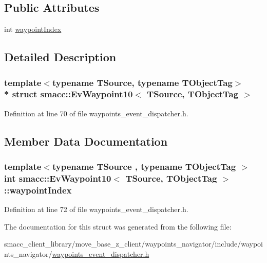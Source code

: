 \subsection*{Public Attributes}
\begin{DoxyCompactItemize}
\item 
int \hyperlink{structsmacc_1_1EvWaypoint10_a142f5446f2f9181a72b36b1d21d9adba}{waypoint\+Index}
\end{DoxyCompactItemize}


\subsection{Detailed Description}
\subsubsection*{template$<$typename T\+Source, typename T\+Object\+Tag$>$\\*
struct smacc\+::\+Ev\+Waypoint10$<$ T\+Source, T\+Object\+Tag $>$}



Definition at line 70 of file waypoints\+\_\+event\+\_\+dispatcher.\+h.



\subsection{Member Data Documentation}
\subsubsection[{\texorpdfstring{waypoint\+Index}{waypointIndex}}]{\setlength{\rightskip}{0pt plus 5cm}template$<$typename T\+Source , typename T\+Object\+Tag $>$ int {\bf smacc\+::\+Ev\+Waypoint10}$<$ T\+Source, T\+Object\+Tag $>$\+::waypoint\+Index}\hypertarget{structsmacc_1_1EvWaypoint10_a142f5446f2f9181a72b36b1d21d9adba}{}\label{structsmacc_1_1EvWaypoint10_a142f5446f2f9181a72b36b1d21d9adba}


Definition at line 72 of file waypoints\+\_\+event\+\_\+dispatcher.\+h.



The documentation for this struct was generated from the following file\+:\begin{DoxyCompactItemize}
\item 
smacc\+\_\+client\+\_\+library/move\+\_\+base\+\_\+z\+\_\+client/waypoints\+\_\+navigator/include/waypoints\+\_\+navigator/\hyperlink{waypoints__event__dispatcher_8h}{waypoints\+\_\+event\+\_\+dispatcher.\+h}\end{DoxyCompactItemize}
